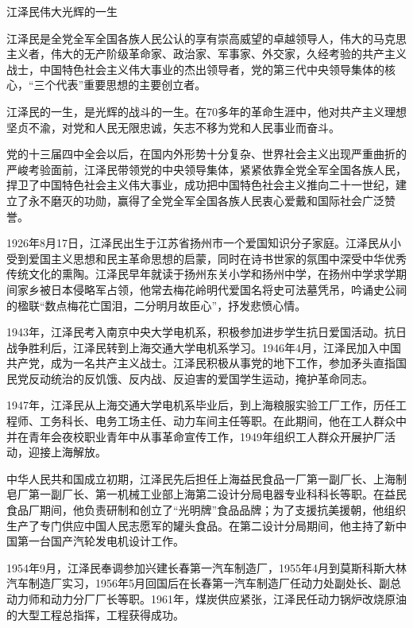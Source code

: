 \documentclass[UTF8, 11pt, oneside]{ctexart}
\begin{document}
\begin{center}
    \LARGE{江泽民伟大光辉的一生\footnotemark}
\end{center}

江泽民是全党全军全国各族人民公认的享有崇高威望的卓越领导人，伟大的马克思主义者，伟大的无产阶级革命家、政治家、军事家、外交家，久经考验的共产主义战士，中国特色社会主义伟大事业的杰出领导者，党的第三代中央领导集体的核心，“三个代表”重要思想的主要创立者。

江泽民的一生，是光辉的战斗的一生。在70多年的革命生涯中，他对共产主义理想坚贞不渝，对党和人民无限忠诚，矢志不移为党和人民事业而奋斗。

党的十三届四中全会以后，在国内外形势十分复杂、世界社会主义出现严重曲折的严峻考验面前，江泽民带领党的中央领导集体，紧紧依靠全党全军全国各族人民，捍卫了中国特色社会主义伟大事业，成功把中国特色社会主义推向二十一世纪，建立了永不磨灭的功勋，赢得了全党全军全国各族人民衷心爱戴和国际社会广泛赞誉。

1926年8月17日，江泽民出生于江苏省扬州市一个爱国知识分子家庭。江泽民从小受到爱国主义思想和民主革命思想的启蒙，同时在诗书世家的氛围中深受中华优秀传统文化的熏陶。江泽民早年就读于扬州东关小学和扬州中学，在扬州中学求学期间家乡被日本侵略军占领，他常去梅花岭明代爱国名将史可法墓凭吊，吟诵史公祠的楹联“数点梅花亡国泪，二分明月故臣心”，抒发悲愤心情。

1943年，江泽民考入南京中央大学电机系，积极参加进步学生抗日爱国活动。抗日战争胜利后，江泽民转到上海交通大学电机系学习。1946年4月，江泽民加入中国共产党，成为一名共产主义战士。江泽民积极从事党的地下工作，参加矛头直指国民党反动统治的反饥饿、反内战、反迫害的爱国学生运动，掩护革命同志。

1947年，江泽民从上海交通大学电机系毕业后，到上海粮服实验工厂工作，历任工程师、工务科长、电务工场主任、动力车间主任等职。在此期间，他在工人群众中并在青年会夜校职业青年中从事革命宣传工作，1949年组织工人群众开展护厂活动，迎接上海解放。

中华人民共和国成立初期，江泽民先后担任上海益民食品一厂第一副厂长、上海制皂厂第一副厂长、第一机械工业部上海第二设计分局电器专业科科长等职。在益民食品厂期间，他负责研制和创立了“光明牌”食品品牌；为了支援抗美援朝，他组织生产了专门供应中国人民志愿军的罐头食品。在第二设计分局期间，他主持了新中国第一台国产汽轮发电机设计工作。

1954年9月，江泽民奉调参加兴建长春第一汽车制造厂，1955年4月到莫斯科斯大林汽车制造厂实习，1956年5月回国后在长春第一汽车制造厂任动力处副处长、副总动力师和动力分厂厂长等职。1961年，煤炭供应紧张，江泽民任动力锅炉改烧原油的大型工程总指挥，工程获得成功。
\end{document}
